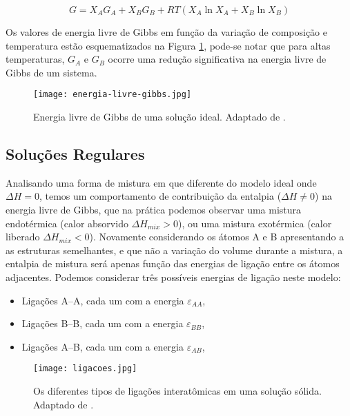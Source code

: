 \begin{equation} 
G=X_{A}G_{A} + X_{B}G_{B} + RT(X_{A}\ln X_{A} + X_{B}\ln X_{B})
\label{eq:livre-gibbs}
\end{equation}

Os valores de energia livre de Gibbs em função da variação de composição e
temperatura estão esquematizados na Figura \ref{fig:energia-livre-gibbs}, pode-se notar que para altas temperaturas, $G_{A}$ e $G_{B}$ ocorre uma redução significativa na energia livre de Gibbs de um sistema.

\begin{figure}[ht]
    \centering
    \texttt{[image: energia-livre-gibbs.jpg]} 
    \caption{Energia livre de Gibbs de uma solução ideal. Adaptado de \cite{porter2009phase}.}
    \label{fig:energia-livre-gibbs}
\end{figure}

\subsection{Soluções Regulares}\label{sec:LABEL_CHP_2_SEC_A_SUB_C}

Analisando uma forma de mistura em que diferente do modelo ideal onde $\Delta H = 0$, temos um comportamento de contribuição da entalpia ($\Delta H \neq 0$) na energia livre de Gibbs, que na prática podemos observar uma mistura endotérmica (calor absorvido $\Delta H_{mix}>0$), ou uma mistura exotérmica (calor liberado $\Delta H_{mix}<0$). Novamente considerando os átomos A e B apresentando a as estruturas semelhantes, e que não a variação do volume durante a mistura, a entalpia de mistura será apenas função das energias de ligação entre os átomos adjacentes. Podemos considerar três possíveis energias de ligação neste modelo:
\begin{itemize}
  \item Ligações A--A, cada um com a energia $ \varepsilon_{AA}$, 
  \item Ligações B--B, cada um com a energia $ \varepsilon_{BB}$,
  \item Ligações A--B, cada um com a energia $ \varepsilon_{AB}$,
\end{itemize}

\begin{figure}[ht]
    \centering
    \texttt{[image: ligacoes.jpg]} 
    \caption{Os diferentes tipos de ligações interatômicas em uma solução sólida. Adaptado de \cite{porter2009phase}.}
    \label{fig:ligacoes-interatomicas}
\end{figure}

